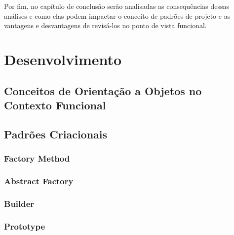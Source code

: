 \documentclass[
	12pt,				%
	openright,			%
	twoside,			%
	a4paper,			%
	english,			%
	french,				%
	spanish,			%
	brazil				%
	]{abntex2}
\begin{document}
Por fim, no capítulo de conclusão serão analisadas 
as consequências dessas análises e como elas podem 
impactar o conceito de padrões de projeto e as vantagens 
e desvantagens de revisá-los no ponto de vista funcional.




\part{Desenvolvimento}

%
\chapter{Conceitos de Orientação a Objetos no Contexto Funcional}

\chapter{Padrões Criacionais}

%
%
%
%
%
\section{Factory Method}
\section{Abstract Factory}
\section{Builder}
\section{Prototype}
\end{document}

